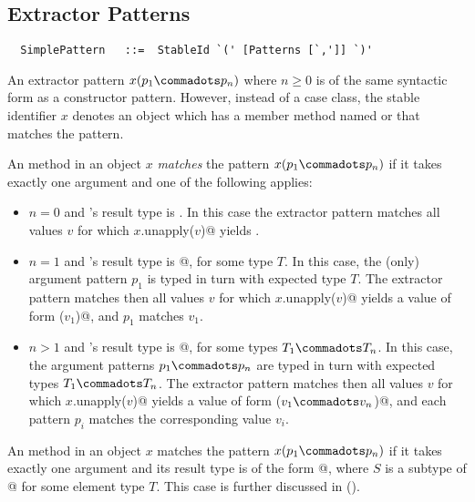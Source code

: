 \subsection{Extractor Patterns}\label{sec:extractor-patterns}

\syntax\begin{lstlisting}
  SimplePattern   ::=  StableId `(' [Patterns [`,']] `)'
\end{lstlisting}

An extractor pattern $x(p_1 \commadots p_n)$ where $n \geq 0$ is of
the same syntactic form as a constructor pattern. However, instead of
a case class, the stable identifier $x$ denotes an object which has a
member method named  or  that matches
the pattern.

An  method in an object $x$ {\em matches} the pattern
$x(p_1 \commadots p_n)$ if it takes exactly one argument and one of
the following applies:
\begin{itemize}
\item[]
$n=0$ and 's result type is . In this case
the extractor pattern matches all values $v$ for which 
\lstinline@$x$.unapply($v$)@ yields .
\item[]
$n=1$ and 's result type is \lstinline@Option[$T$]@, for some
type $T$.  In this case, the (only) argument pattern $p_1$ is typed in
turn with expected type $T$.  The extractor pattern matches then all
values $v$ for which \lstinline@$x$.unapply($v$)@ yields a value of form
\lstinline@Some($v_1$)@, and $p_1$ matches $v_1$.
\item[]
$n>1$ and 's result type is 
\lstinline@Option[{$T_1 \commadots T_n$}]@, for some
types $T_1 \commadots T_n$.  In this case, the argument patterns $p_1
\commadots p_n$ are typed in turn with expected types $T_1 \commadots
T_n$.  The extractor pattern matches then all values $v$ for which
\lstinline@$x$.unapply($v$)@ yields a value of form
\lstinline@Some({$v_1 \commadots v_n$})@, and each pattern
$p_i$ matches the corresponding value $v_i$.
\end{itemize}

An  method in an object $x$ matches the pattern
$x(p_1 \commadots p_n)$ if it takes exactly one argument and its
result type is of the form \lstinline@Option[$S$]@, where $S$ is a subtype of
\lstinline@Seq[$T$]@ for some element type $T$. 
This case is further discussed in ().

